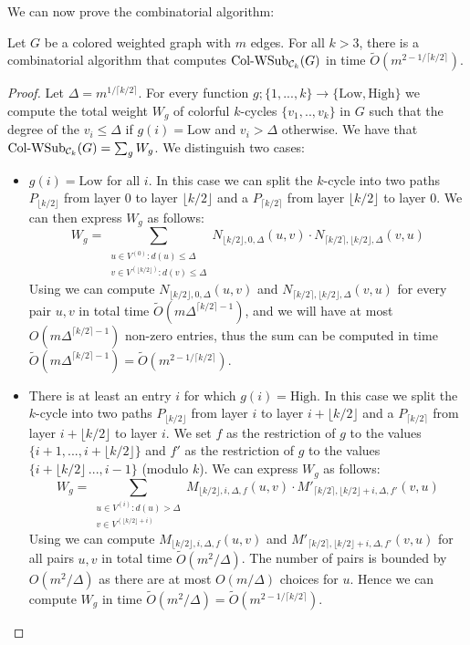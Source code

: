 \documentclass[a4paper,UKenglish,cleveref, autoref, numberwithinsect, thm-restate]{lipics-v2021}
\newcommand{\cycle}[1]{\cC_{#1}}
\newcommand{\WSub}[2]{\mathrm{\text{Col-WSub}}_{#2}(#1)}
\newcommand{\cC}{{\cal C}}
\begin{document}
	We can now prove the combinatorial algorithm:
	
	\begin{lemma} \label{lem:wsub_cycles_comb}
		Let $G$ be a colored weighted graph with $m$ edges. For all $k>3$, there is a combinatorial algorithm that computes $\WSub{G}{\cycle{k}}$ in time $\tilde{O}(m^{2-1/\lceil k/2 \rceil })$.
	\end{lemma}
	\begin{proof}
		Let $\Delta = m^{1/\lceil k/2 \rceil}$. For every function $g ; \{1,...,k\} \to \{\text{Low}, \text{High}\}$ we compute the total weight $W_g$ of colorful $k$-cycles $\{v_1,..,v_k\}$ in $G$ such that the degree of the $v_i \leq \Delta$ if $g(i)=\text{Low}$ and $v_i > \Delta$ otherwise. We have that $\WSub{G}{\cycle{k}} = \sum_g W_g$. We distinguish two cases:
		\begin{itemize}
			\item $g(i) = \text{Low}$ for all $i$. In this case we can split the $k$-cycle into two paths $P_{\lfloor k/2 \rfloor}$ from layer $0$ to layer $\lfloor k/2 \rfloor$ and a $P_{\lceil k/2 \rceil}$ from layer $\lfloor k/2 \rfloor$ to layer $0$. We can then express $W_g$ as follows:
			\[
				W_g = \sum_{\substack {u \in V^{(0)} : d(u) \leq \Delta \\ v \in V^{(\lfloor k/2 \rfloor)}: d(v) \leq \Delta}} N_{\lfloor k/2 \rfloor,0,\Delta}(u,v) \cdot N_{\lceil k/2 \rceil,\lfloor k/2 \rfloor,\Delta}(v,u)
			\]
			Using  we can compute $N_{\lfloor k/2 \rfloor,0,\Delta}(u,v)$ and $N_{\lceil k/2 \rceil,\lfloor k/2 \rfloor,\Delta}(v,u)$ for every pair $u,v$ in total time $\tilde{O}(m\Delta^{\lceil k/2 \rceil - 1})$, and we will have at most $O(m\Delta^{\lceil k/2 \rceil - 1})$ non-zero entries, thus the sum can be computed in time $\tilde{O}(m\Delta^{\lceil k/2 \rceil - 1}) = \tilde{O}(m^{2-1/\lceil k/2 \rceil}) $.
			
			\item There is at least an entry $i$ for which $g(i) = \text{High}$. In this case we split the $k$-cycle into two paths $P_{\lfloor k/2 \rfloor}$ from layer $i$ to layer $i+\lfloor k/2 \rfloor$ and a $P_{\lceil k/2 \rceil}$ from layer $i+\lfloor k/2 \rfloor$ to layer $i$. We set $f$ as the restriction of $g$ to the values $\{i+1,...,i+\lfloor k/2 \rfloor\}$ and $f'$ as the restriction of $g$ to the values  $\{i+\lfloor k/2 \rfloor\,...,i-1\}$ (modulo $k$). We can express $W_g$ as follows:
			\[
				W_g = \sum_{\substack {u \in V^{(i)} : d(u) > \Delta \\ v \in V^{(\lfloor k/2 \rfloor+i)}}} M_{\lfloor k/2 \rfloor,i,\Delta, f}(u,v) \cdot M'_{\lceil k/2 \rceil,\lfloor k/2 \rfloor+i,\Delta, f'}(v,u)
			\]
			Using  we can compute $ M_{\lfloor k/2 \rfloor,i,\Delta, f}(u,v)$ and $M'_{\lceil k/2 \rceil,\lfloor k/2 \rfloor+i,\Delta, f'}(v,u)$ for all pairs $u,v$ in total time $\tilde{O}(m^2/\Delta)$. The number of pairs is bounded by $O(m^2/\Delta)$ as there are at most $O(m/\Delta)$ choices for $u$. Hence we can compute $W_g$ in time  $\tilde{O}(m^2/\Delta) = \tilde{O}(m^{2-1/\lceil k/2 \rceil})$.
		\end{itemize}
	\end{proof}	
	
\end{document}
